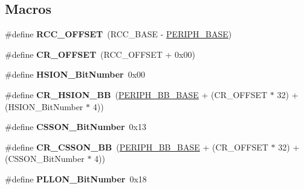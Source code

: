 \subsection*{Macros}
\begin{DoxyCompactItemize}
\item 
\#define {\bfseries R\+C\+C\+\_\+\+O\+F\+F\+S\+ET}~(R\+C\+C\+\_\+\+B\+A\+SE -\/ \hyperlink{group___peripheral__memory__map_ga9171f49478fa86d932f89e78e73b88b0}{P\+E\+R\+I\+P\+H\+\_\+\+B\+A\+SE})\hypertarget{group___r_c_c_ga539e07c3b3c55f1f1d47231341fb11e1}{}\label{group___r_c_c_ga539e07c3b3c55f1f1d47231341fb11e1}

\item 
\#define {\bfseries C\+R\+\_\+\+O\+F\+F\+S\+ET}~(R\+C\+C\+\_\+\+O\+F\+F\+S\+ET + 0x00)\hypertarget{group___r_c_c_gafa1d3d0ea72132df651c76fc1bdffffc}{}\label{group___r_c_c_gafa1d3d0ea72132df651c76fc1bdffffc}

\item 
\#define {\bfseries H\+S\+I\+O\+N\+\_\+\+Bit\+Number}~0x00\hypertarget{group___r_c_c_ga3d3085e491cbef815d223afbe5bf1930}{}\label{group___r_c_c_ga3d3085e491cbef815d223afbe5bf1930}

\item 
\#define {\bfseries C\+R\+\_\+\+H\+S\+I\+O\+N\+\_\+\+BB}~(\hyperlink{group___peripheral__memory__map_gaed7efc100877000845c236ccdc9e144a}{P\+E\+R\+I\+P\+H\+\_\+\+B\+B\+\_\+\+B\+A\+SE} + (C\+R\+\_\+\+O\+F\+F\+S\+ET $\ast$ 32) + (H\+S\+I\+O\+N\+\_\+\+Bit\+Number $\ast$ 4))\hypertarget{group___r_c_c_gac3290a833c0e35ec17d32c2d494e6133}{}\label{group___r_c_c_gac3290a833c0e35ec17d32c2d494e6133}

\item 
\#define {\bfseries C\+S\+S\+O\+N\+\_\+\+Bit\+Number}~0x13\hypertarget{group___r_c_c_ga253fa44d87aabc55f0cd6628e77a51fd}{}\label{group___r_c_c_ga253fa44d87aabc55f0cd6628e77a51fd}

\item 
\#define {\bfseries C\+R\+\_\+\+C\+S\+S\+O\+N\+\_\+\+BB}~(\hyperlink{group___peripheral__memory__map_gaed7efc100877000845c236ccdc9e144a}{P\+E\+R\+I\+P\+H\+\_\+\+B\+B\+\_\+\+B\+A\+SE} + (C\+R\+\_\+\+O\+F\+F\+S\+ET $\ast$ 32) + (C\+S\+S\+O\+N\+\_\+\+Bit\+Number $\ast$ 4))\hypertarget{group___r_c_c_gaca914aed10477ae4090fea0a9639b1ea}{}\label{group___r_c_c_gaca914aed10477ae4090fea0a9639b1ea}

\item 
\#define {\bfseries P\+L\+L\+O\+N\+\_\+\+Bit\+Number}~0x18\hypertarget{group___r_c_c_gab24d7f5f8e4b3b717fd91b54f393f6a3}{}\label{group___r_c_c_gab24d7f5f8e4b3b717fd91b54f393f6a3}


\end{DoxyCompactItemize}
